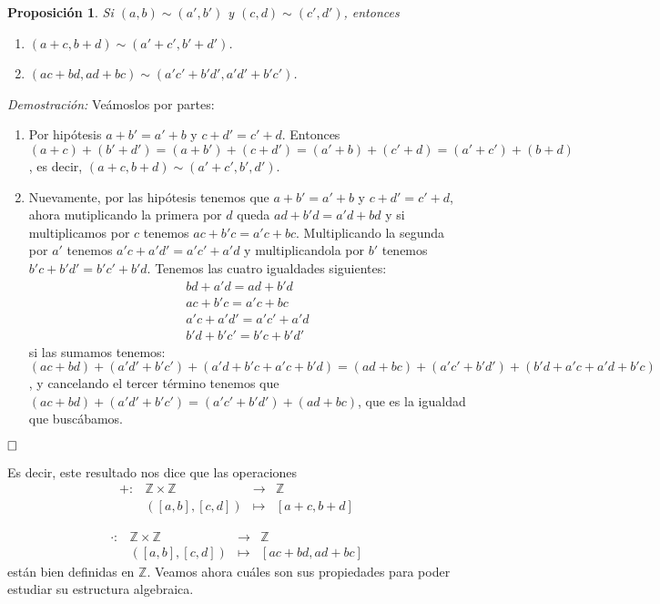 \documentclass[12pt]{article}
\newtheorem{proposition}[theorem]{Proposición}
\begin{document}
\begin{proposition}Si $(a,b) \sim (a',b')$ y $(c,d) \sim (c',d')$, entonces
\begin{enumerate}
\item $(a+c, b+d)\sim(a'+c',b'+d')$.
\item $(ac+bd, ad+bc) \sim (a'c'+b'd',a'd'+b'c')$.
\end{enumerate}
\end{proposition}
\emph{Demostración: }Veámoslos por partes: 
\begin{enumerate}
\item Por hipótesis $a+b' = a'+b$ y $c+d' = c'+d$. Entonces $(a+c)+(b'+d') = (a+b')+(c+d') = (a'+b) + (c'+d) = (a'+c')+(b+d)$, es decir, $(a+c, b+d) \sim (a'+c', b',d')$.
\item Nuevamente, por las hipótesis tenemos que $a+b'=a'+b$ y $c+d'=c'+d$, ahora mutiplicando la primera por $d$ queda $ad+b'd = a'd + bd$ y si multiplicamos por $c$ tenemos $ac+b'c = a'c + bc$. Multiplicando la segunda por $a'$ tenemos $a'c + a'd' = a'c' + a'd$ y multiplicandola por $b'$ tenemos $b'c +b'd' = b'c' + b'd$. Tenemos las cuatro igualdades siguientes: 
$$\begin{array}{rcc}
&bd+a'd = ad+b'd & \\
&ac+b'c=a'c+bc& \\
&a'c+a'd'=a'c'+a'd& \\
&b'd+b'c'=b'c+b'd'&
\end{array}
$$
si las sumamos tenemos: $(ac+bd)+(a'd'+b'c') +(a'd+b'c+a'c+b'd) =(ad+bc)+(a'c'+b'd')+(b'd+a'c+a'd+b'c)$, y cancelando el tercer término tenemos que $(ac+bd)+(a'd'+b'c')=(a'c'+b'd')+(ad+bc)$, que es la igualdad que buscábamos. 
\end{enumerate}

$\hfill \square$

Es decir, este resultado nos dice que las operaciones $$\begin{array}{rccl}
+\colon &\mathbb{Z}\times \mathbb{Z}& \longrightarrow & \mathbb{Z}\\
&([a,b],[c,d])& \longmapsto &[a+c,b+d]
\end{array}
$$

$$\begin{array}{rccl}
\cdot\colon &\mathbb{Z}\times \mathbb{Z}& \longrightarrow & \mathbb{Z}\\
&([a,b],[c,d])& \longmapsto &[ac+bd,ad+bc]
\end{array}
$$
están bien definidas en $\mathbb{Z}$. Veamos ahora cuáles son sus propiedades para poder estudiar su estructura algebraica.
\end{document}

